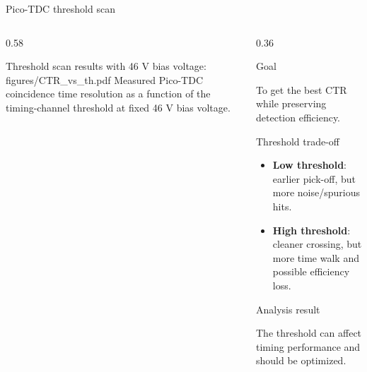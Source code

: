 \begin{frame}{Pico-TDC threshold scan}

\small

\begin{columns}[T,totalwidth=\textwidth]

\begin{column}{0.58\textwidth}

\centering
\vspace{0.5cm}
Threshold scan results with 46 V bias voltage:
\vspace{0.2cm}
\smartimage[0.92\linewidth]{0.82\textheight}
{figures/CTR_vs_th.pdf}
{Measured Pico-TDC coincidence time resolution as a function of the timing-channel threshold at fixed 46 V bias voltage.}

\end{column}

\begin{column}{0.36\textwidth}

\begin{block}{Goal}

To get the best CTR while preserving detection efficiency.

\end{block}

\begin{block}{Threshold trade-off}

\begin{itemize}

  \item \textbf{Low threshold}: earlier pick-off, but more noise/spurious hits.

  \item \textbf{High threshold}: cleaner crossing, but more time walk and possible efficiency loss.

\end{itemize}

\end{block}

\begin{alertblock}{Analysis result}

The threshold can affect timing performance and should be optimized.

\end{alertblock}

\end{column}

\end{columns}

\end{frame}

